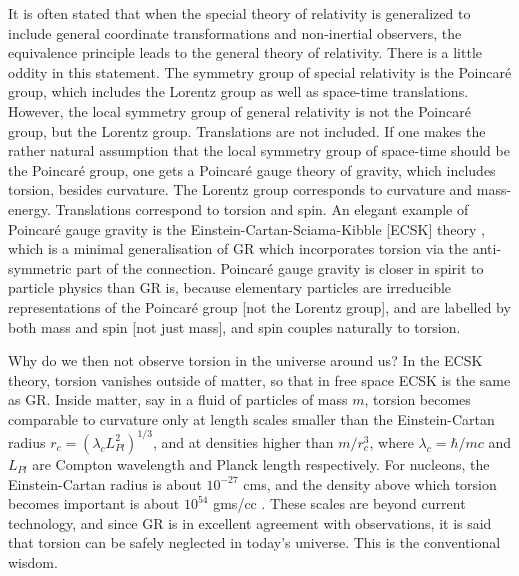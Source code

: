 \documentclass[prd, preprint, 12pt]{revtex4-1}
\begin{document}
\newpage


\bigskip

\noindent It is often stated that when the special theory of relativity is generalized to include general coordinate transformations and non-inertial observers,  the equivalence principle leads to the general theory of relativity. There is a little oddity in this statement. The symmetry group of special relativity is the Poincar\'e group, which includes the Lorentz group as well as 
space-time translations. However, the local symmetry group of general relativity is not the Poincar\'e group, but the Lorentz group. Translations are not included. If one makes the rather natural assumption  that the local symmetry group of space-time should be the Poincar\'e group, one gets a Poincar\'e gauge theory of gravity, which includes torsion, besides curvature. The Lorentz group corresponds to curvature and mass-energy. Translations correspond to torsion and spin. An elegant example of Poincar\'e gauge gravity is the Einstein-Cartan-Sciama-Kibble [ECSK] theory \cite{Hehl}, which is a minimal generalisation of GR which incorporates torsion via the anti-symmetric part of the connection. Poincar\'e gauge gravity is closer in spirit to particle physics than GR is, because elementary particles are irreducible representations of the Poincar\'e group [not the Lorentz group], and are labelled by both mass and spin [not just mass], and spin couples naturally to torsion.

Why  do we then not observe torsion in the universe around us? In the ECSK theory, torsion vanishes outside of matter, so that in free space ECSK is the same as GR. Inside matter, say in a fluid of particles of mass $m$, torsion becomes comparable to curvature only at length scales smaller than the Einstein-Cartan radius $r_c = (\lambda_c L_{Pl}^2)^{1/3}$, and at densities higher than $m/r_c^3$, where $\lambda_c=\hbar/mc$ and $L_{Pl}$ are Compton wavelength and Planck length respectively. For nucleons, the Einstein-Cartan radius is about $10^{-27}$ cms, and the density above which torsion becomes important is about $10^{54}$ gms/cc \cite{Hehl}. These scales are beyond current technology, and since GR is in excellent agreement with observations, it is said that torsion can be safely neglected in today's universe. This is the conventional wisdom.
\end{document}
